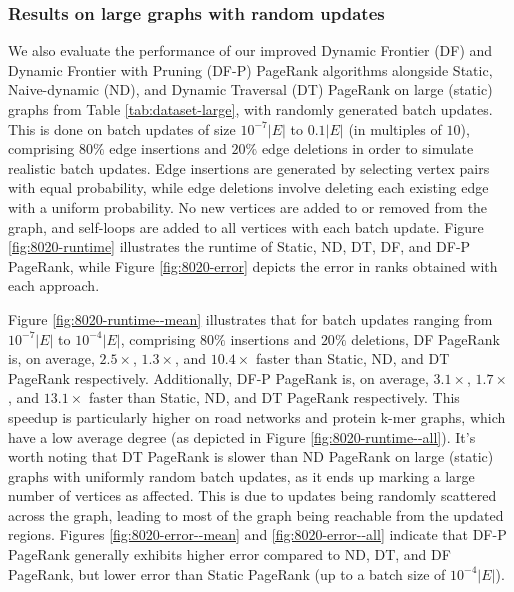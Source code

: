 



\subsubsection{Results on large graphs with random updates}

We also evaluate the performance of our improved Dynamic Frontier (DF) and Dynamic Frontier with Pruning (DF-P) PageRank algorithms alongside Static, Naive-dynamic (ND), and Dynamic Traversal (DT) PageRank on large (static) graphs from Table \ref{tab:dataset-large}, with randomly generated batch updates. This is done on batch updates of size $10^{-7}|E|$ to $0.1|E|$ (in multiples of $10$), comprising $80\%$ edge insertions and $20\%$ edge deletions in order to simulate realistic batch updates. Edge insertions are generated by selecting vertex pairs with equal probability, while edge deletions involve deleting each existing edge with a uniform probability. No new vertices are added to or removed from the graph, and self-loops are added to all vertices with each batch update. Figure \ref{fig:8020-runtime} illustrates the runtime of Static, ND, DT, DF, and DF-P PageRank, while Figure \ref{fig:8020-error} depicts the error in ranks obtained with each approach.




Figure \ref{fig:8020-runtime--mean} illustrates that for batch updates ranging from $10^{-7}|E|$ to $10^{-4}|E|$, comprising $80\%$ insertions and $20\%$ deletions, DF PageRank is, on average, $2.5\times$, $1.3\times$, and $10.4\times$ faster than Static, ND, and DT PageRank respectively. Additionally, DF-P PageRank is, on average, $3.1\times$, $1.7\times$, and $13.1\times$ faster than Static, ND, and DT PageRank respectively. This speedup is particularly higher on road networks and protein k-mer graphs, which have a low average degree (as depicted in Figure \ref{fig:8020-runtime--all}). It's worth noting that DT PageRank is slower than ND PageRank \cite{sahu2024incrementally} on large (static) graphs with uniformly random batch updates, as it ends up marking a large number of vertices as affected. This is due to updates being randomly scattered across the graph, leading to most of the graph being reachable from the updated regions. Figures \ref{fig:8020-error--mean} and \ref{fig:8020-error--all} indicate that DF-P PageRank generally exhibits higher error compared to ND, DT, and DF PageRank, but lower error than Static PageRank (up to a batch size of $10^{-4}|E|$).


